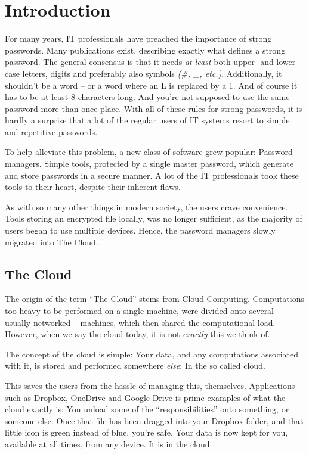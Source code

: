 \chapter{Introduction}
\label{chap:intro}
	For many years, IT professionals have preached the importance of strong passwords. Many publications exist, describing exactly what defines a strong password. The general consensus is that it needs \emph{at least} both upper- and lower-case letters, digits and preferably also symbols \emph{(\#, \_, etc.)}. Additionally, it shouldn't be a word -- or a word where an L is replaced by a 1. And of course it has to be at least 8 characters long. And you're not supposed to use the same password more than once place. With all of these rules for strong passwords, it is hardly a surprise that a lot of the regular users of IT systems resort to simple and repetitive passwords.

	To help alleviate this problem, a new class of software grew popular: Password managers. Simple tools, protected by a single master password, which generate and store passwords in a secure manner. A lot of the IT professionals took these tools to their heart, despite their inherent flaws. 

	As with so many other things in modern society, the users crave convenience. Tools storing an encrypted file locally, was no longer sufficient, as the majority of users began to use multiple devices. Hence, the password managers slowly migrated into The Cloud.

	\section{The Cloud}
		The origin of the term ``The Cloud'' stems from Cloud Computing. Computations too heavy to be performed on a single machine, were divided onto several -- usually networked -- machines, which then shared the computational load. However, when we say the cloud today, it is not \emph{exactly} this we think of.

		The concept of the cloud is simple: Your data, and any computations associated with it, is stored and performed somewhere \emph{else}: In the so called cloud.

		This saves the users from the hassle of managing this, themselves. Applications such as Dropbox, OneDrive and Google Drive is prime examples of what the cloud exactly is: You unload some of the ``responsibilities'' onto something, or someone else. Once that file has been dragged into your Dropbox folder, and that little icon is green instead of blue, you're safe. Your data is now kept for you, available at all times, from any device. It is in the cloud.

